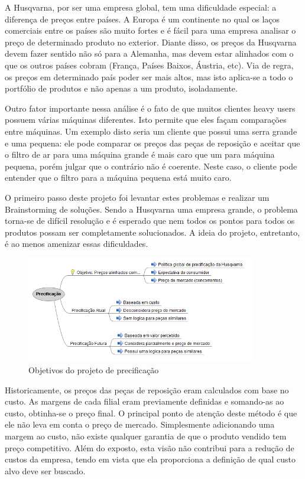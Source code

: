 \documentclass[12pt]{article}
\begin{document}
	A Husqvarna, por ser uma empresa global, tem uma dificuldade especial: a diferença de preços entre países. A Europa é um continente no qual os laços comerciais entre os países são muito fortes e é fácil para uma empresa analisar o preço de determinado produto no exterior. Diante disso, os preços da Husqvarna devem fazer sentido não só para a Alemanha, mas devem estar alinhados com o que os outros países cobram (França, Países Baixos, Áustria, etc). Via de regra, os preços em determinado país poder ser mais altos, mas isto aplica-se a todo o portfólio de produtos e não apenas a um produto, isoladamente.

	Outro fator importante nessa análise é o fato de que muitos clientes heavy users possuem várias máquinas diferentes. Isto permite que eles façam comparações entre máquinas. Um exemplo disto seria um cliente que possui uma serra grande e uma pequena: ele pode comparar os preços das peças de reposição e aceitar que o filtro de ar para uma máquina grande é mais caro que um para máquina pequena, porém julgar que o contrário não é coerente. Neste caso, o cliente pode entender que o filtro para a máquina pequena está muito caro.

	O primeiro passo deste projeto foi levantar estes problemas e realizar um Brainstorming de soluções. Sendo a Husqvarna uma empresa grande, o problema torna-se de difícil resolução e é esperado que nem todos os pontos para todos os produtos possam ser completamente solucionados. A ideia do projeto, entretanto, é ao menos amenizar essas dificuldades.

\begin{figure}[h!]
	\centering
	\includegraphics[width=0.9\textwidth]{img/pricing-pt.png}
	\caption{Objetivos do projeto de precificação}
	\label{fig:pricing}
\end{figure}

	Historicamente, os preços das peças de reposição eram calculados com base no custo. As margens de cada filial eram previamente definidas e somando-as ao custo, obtinha-se o preço final. O principal ponto de atenção deste método é que ele não leva em conta o preço de mercado. Simplesmente adicionando uma margem ao custo, não existe qualquer garantia de que o produto vendido tem preço competitivo. Além do exposto, esta visão não contribui para a redução de custos da empresa, tendo em vista que ela proporciona a definição de qual custo alvo deve ser buscado.
\end{document}
